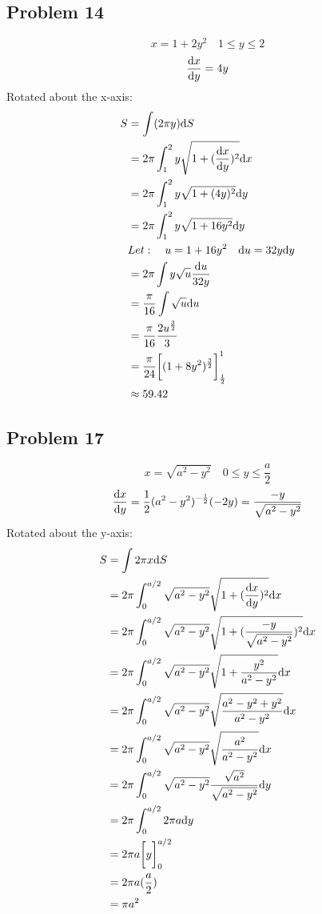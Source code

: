 \documentclass[letterpaper, 12pt]{math}
\begin{document}
\subsection*{Problem 14}
\[ x = 1+2y^{2} \quad 1 \leq y \leq 2 \]
\[ \frac{\mathrm{d}{x}}{\mathrm{d}{y}} = 4y \]
Rotated about the x-axis:
\begin{align*}
  S &= \int(2\pi y)\mathrm{d}{S} \\
  &= 2\pi\int_{1}^{2}{ y\sqrt{1+(\frac{\mathrm{d}{x}}{\mathrm{d}{y}})^{2}}\mathrm{d}{x}} \\
  &= 2\pi\int_{1}^{2}{y\sqrt{1+(4y)^{2}}\mathrm{d}{y}} \\
  &= 2\pi\int_{1}^{2}{y\sqrt{1+16y^{2}}\mathrm{d}{y}} \\
  & Let: \quad u = 1+16y^{2} \quad \mathrm{d}{u} = 32y\mathrm{d}{y} \\
  &= 2\pi\int{y\sqrt{u}\frac{\mathrm{d}{u}}{32y}} \\
  &= \frac{\pi}{16}\int{\sqrt{u}\mathrm{d}{u}} \\
  &= \frac{\pi}{16}\frac{2u^{\frac{3}{2}}}{3} \\
  &= \frac{\pi}{24}\bigg[(1+8y^{2})^{\frac{3}{2}}\bigg]_{\frac{1}{2}}^{1} \\
  & \approx 59.42
\end{align*}

\subsection*{Problem 17}
\[ x = \sqrt{a^{2}-y^{2}} \quad 0 \leq y \leq \frac{a}{2} \]
\[ \frac{\mathrm{d}{x}}{\mathrm{d}{y}} = \frac{1}{2}(a^{2}-y^{2})^{-\frac{1}{2}}(-2y)
   = \frac{-y}{\sqrt{a^{2}-y^{2}}} \]
Rotated about the y-axis:
\begin{align*}
  S &= \int{2\pi x\mathrm{d}{S}} \\
  &= 2\pi\int_{0}^{a/2}{
    \sqrt{a^{2}-y^{2}}\sqrt{1+(\frac{\mathrm{d}{x}}{\mathrm{d}{y}})^{2}}\mathrm{d}{x}} \\
  &= 2\pi\int_{0}^{a/2}{
    \sqrt{a^{2}-y^{2}}\sqrt{1+(\frac{-y}{\sqrt{a^{2}-y^{2}}})^{2}}\mathrm{d}{x}} \\
  &= 2\pi\int_{0}^{a/2}{
    \sqrt{a^{2}-y^{2}}\sqrt{1+\frac{y^{2}}{a^{2}-y^{2}}}\mathrm{d}{x}} \\
  &= 2\pi\int_{0}^{a/2}{
    \sqrt{a^{2}-y^{2}}\sqrt{\frac{a^{2}-y^{2}+y^{2}}{a^{2}-y^{2}}}\mathrm{d}{x}} \\
  &= 2\pi\int_{0}^{a/2}{
    \sqrt{a^{2}-y^{2}}\sqrt{\frac{a^{2}}{a^{2}-y^{2}}}\mathrm{d}{x}} \\
  &= 2\pi\int_{0}^{a/2}{
    \sqrt{a^{2}-y^{2}}\frac{\sqrt{a^{2}}}{\sqrt{a^{2}-y^{2}}}\mathrm{d}{y}} \\
  &= 2\pi\int_{0}^{a/2}{2\pi a\mathrm{d}{y}} \\
  &= 2\pi a\bigg[y\bigg]_{0}^{a/2} \\
  &= 2\pi a(\frac{a}{2}) \\
  &= \pi a^{2}
\end{align*}
\end{document}

